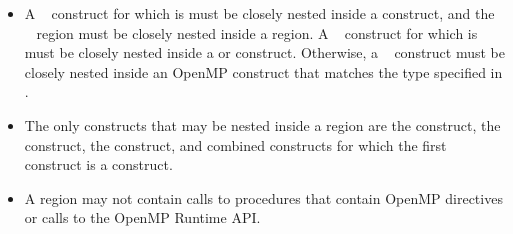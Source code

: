 \begin{itemize}
\item A ~ construct for which
       is  must be closely nested
      inside a  construct, and the ~
      region must be closely nested inside a  region. A
      ~ construct for which
       is  must be closely nested
      inside a  or  construct. Otherwise, a
      ~ construct must be closely nested inside
      an OpenMP construct that matches the type specified in
      .
\item The only constructs that may be nested inside a  region
      are the  construct, the  construct, the
       construct, and combined constructs for which the first
      construct is a  construct.
\item A  region may not contain calls to procedures that contain 
      OpenMP directives or calls to the OpenMP Runtime API.
\end{itemize}
